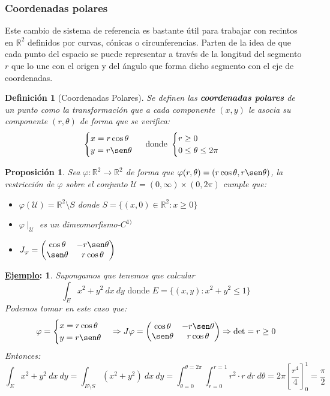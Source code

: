 \documentclass[10pt,a4paper,openright]{book}
\theoremstyle{break}
\newtheorem*{defi}{Definición}
\newtheorem*{prop}{Proposición}
\newtheorem*{ej}{\underline{Ejemplo}:}
\newcommand{\dif}[1]{\ d#1}
\begin{document}
\subsubsection{Coordenadas polares}
Este cambio de sistema de referencia es bastante útil para trabajar con recintos en $\mathbb{R}^2$ definidos por curvas, cónicas o circunferencias. Parten de la idea de que cada punto del espacio se puede representar a través de la longitud del segmento $r$ que lo une con el origen y del ángulo que forma dicho segmento con el eje de coordenadas.

\begin{defi}[Coordenadas Polares]
Se definen las \textbf{coordenadas polares} de un punto como la transformación que a cada componente $(x,y)$ le asocia su componente $(r, \theta)$ de forma que se verifica:
$$\begin{cases} x = r \cos \theta \\ y = r \sen \theta \end{cases} \mbox{ donde } \begin{cases} r \ge 0\\ 0 \le \theta \le 2\pi \end{cases}$$
\end{defi}

\begin{prop}
Sea $\varphi: \mathbb{R}^2\rightarrow  \mathbb{R}^2$ de forma que $\varphi(r, \theta) = (r\cos\theta, r\sen\theta)$, la restricción de $\varphi$ sobre el conjunto $\mathcal{U} = (0,\infty)\times (0, 2\pi)$ cumple que:
\begin{itemize}
\item $\varphi(\mathcal{U}) = \mathbb{R}^2\setminus{S}$ donde $S = \{(x,0)\in \mathbb{R}^2: x\geq 0\}$
\item $\varphi\mid_\mathcal{U}$ es un dimeomorfismo-$C^{1)}$
\item $J_\varphi = \begin{pmatrix}\cos \theta & -r\sen \theta \\ \sen \theta & r\cos \theta\end{pmatrix}$
\end{itemize}
\end{prop}

\begin{ej}
Supongamos que tenemos que calcular
$$\int_E x^2 + y^2 \dif{x}\dif{y} \mbox{ donde } E = \{\left(x, y\right): x^2 + y^2 \le 1\}$$
Podemos tomar en este caso que:
$$\varphi = \begin{cases} x = r\cos \theta \\ y = r\sen\theta \end{cases} \Rightarrow J\varphi = \begin{pmatrix} \cos \theta & -r\sen \theta \\ \sen \theta & r\cos \theta \end{pmatrix} \Rightarrow \det = r \ge 0$$
Entonces:
$$\int_E x^2 + y^2 \dif{x} \dif{y} = \int_{E\setminus S} \left(x^2 + y^2\right) \dif{x} \dif{y} = \int_{\theta = 0}^{\theta = 2\pi} \int_{r = 0}^{r = 1} r^2 \cdot r \dif{r} \dif{\theta} = 2\pi \left[\frac{r^4}{4}\right]_0^1 = \frac{\pi}{2} $$
\end{ej}
\end{document}
